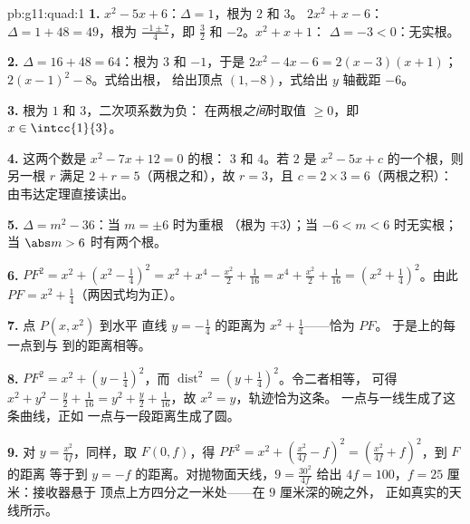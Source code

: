 \begin{solution}{pb:g11:quad:1}
\textbf{1.} $x^2 - 5x + 6$：$\Delta = 1$，根为 $2$ 和 $3$。
$2x^2 + x - 6$：$\Delta = 1 + 48 = 49$，根为
$\frac{-1 \pm 7}{4}$，即 $\frac32$ 和 $-2$。$x^2 + x + 1$：
$\Delta = -3 < 0$：无实根。

\textbf{2.} $\Delta = 16 + 48 = 64$：根为 $3$ 和 $-1$，于是
$2x^2 - 4x - 6 = 2(x - 3)(x + 1)$；
$2(x - 1)^2 - 8$。式给出根，
给出顶点 $(1, -8)$，式给出
$y$ 轴截距 $-6$。

\textbf{3.} 根为 $1$ 和 $3$，二次项系数为负：
在两根\emph{之间}时取值 $\geq 0$，即
$x \in \intcc{1}{3}$。

\textbf{4.} 这两个数是 $x^2 - 7x + 12 = 0$ 的根：
$3$ 和 $4$。若 $2$ 是 $x^2 - 5x + c$ 的一个根，则另一根
$r$ 满足 $2 + r = 5$（两根之和），故 $r = 3$，且
$c = 2 \times 3 = 6$（两根之积）：由韦达定理直接读出。

\textbf{5.} $\Delta = m^2 - 36$：当 $m = \pm 6$ 时为重根
（根为 $\mp 3$）；当 $-6 < m < 6$ 时无实根；当
$\abs m > 6$ 时有两个根。

\textbf{6.} $PF^2 = x^2 + \left(x^2 - \frac14\right)^2
= x^2 + x^4 - \frac{x^2}{2} + \frac{1}{16}
= x^4 + \frac{x^2}{2} + \frac{1}{16}
= \left(x^2 + \frac14\right)^2$。由此
$PF = x^2 + \frac14$（两因式均为正）。

\textbf{7.} 点 $P(x, x^2)$ 到水平
直线 $y = -\frac14$ 的距离为 $x^2 + \frac14$——恰为 $PF$。
于是上的每一点到与
到的距离相等。

\textbf{8.} $PF^2 = x^2 + \left(y - \frac14\right)^2$，而
$\operatorname{dist}^2 = \left(y + \frac14\right)^2$。令二者相等，
可得 $x^2 + y^2 - \frac y2 + \frac{1}{16} = y^2 + \frac y2 +
\frac1{16}$，故 $x^2 = y$，轨迹恰为这条。
一点与一线生成了这条曲线，正如
一点与一段距离生成了圆。

\textbf{9.} 对 $y = \frac{x^2}{4f}$，同样，取
$F(0, f)$，得 $PF^2 = x^2 + \left(\frac{x^2}{4f} - f\right)^2
= \left(\frac{x^2}{4f} + f\right)^2$，到 $F$ 的距离
等于到 $y = -f$ 的距离。对抛物面天线，$9 = \frac{30^2}{4f}$ 给出
$4f = 100$，$f = 25$ 厘米：接收器悬于
顶点上方四分之一米处——在 $9$ 厘米深的碗之外，
正如真实的天线所示。


\end{solution}

